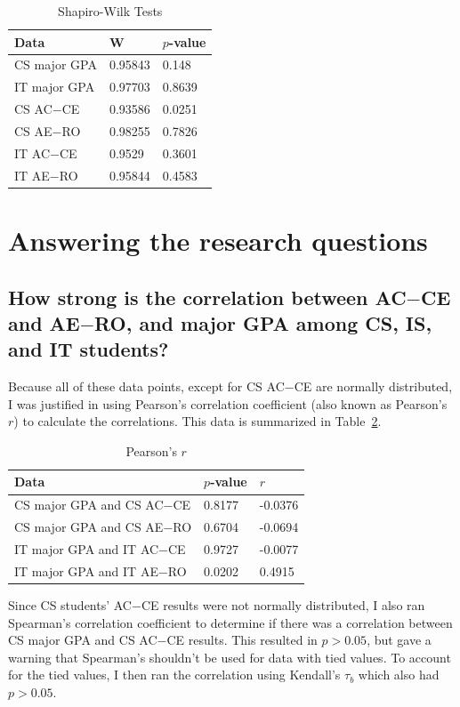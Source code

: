 \begin{table}[!htbp]
  \centering
  \caption{Shapiro-Wilk Tests}
  \label{tab:shapiro-wilk}
  \begin{tabular}{lll}
    \toprule
    Data         & W       & $p$-value \\
    \midrule
    CS major GPA & 0.95843 & 0.148 \\
    IT major GPA & 0.97703 & 0.8639 \\
    CS AC$-$CE     & 0.93586 & 0.0251 \\
    CS AE$-$RO     & 0.98255 & 0.7826 \\
    IT AC$-$CE     & 0.9529  & 0.3601 \\
    IT AE$-$RO     & 0.95844 & 0.4583 \\
    \bottomrule
  \end{tabular}
\end{table}

\section{Answering the research questions}
\subsection{How strong is the correlation between AC$-$CE and AE$-$RO, and major GPA among CS, IS, and IT students?}
Because all of these data points, except for CS AC$-$CE are normally distributed, I was justified in using Pearson's correlation coefficient (also known as Pearson's $r$) to calculate the correlations. This data is summarized in Table~\ref{tab:pearsons}.

\begin{table}[!htbp]
  \centering
  \caption{Pearson's $r$}
  \label{tab:pearsons}
  \begin{tabular}{lll}
    \toprule
    Data                      & $p$-value & $r$ \\
    \midrule
    CS major GPA and CS AC$-$CE & 0.8177    & -0.0376 \\
    CS major GPA and CS AE$-$RO & 0.6704    & -0.0694 \\
    IT major GPA and IT AC$-$CE & 0.9727    & -0.0077 \\
    IT major GPA and IT AE$-$RO & 0.0202    & 0.4915 \\
    \bottomrule
  \end{tabular}
\end{table}

Since CS students' AC$-$CE results were not normally distributed, I also ran Spearman's correlation coefficient to determine if there was a correlation between CS major GPA and CS AC$-$CE results. This resulted in $p>0.05$, but gave a warning that Spearman's shouldn't be used for data with tied values. To account for the tied values, I then ran the correlation using Kendall's $\tau_b$ which also had $p>0.05$.

